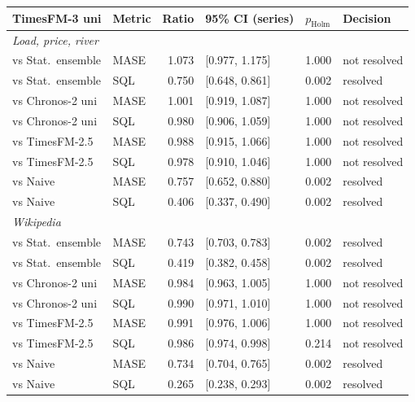 \begin{tabular}{llrlll}
\toprule
TimesFM-3 uni & Metric & Ratio & 95\% CI (series) & $p_{\mathrm{Holm}}$ & Decision \\
\midrule
\multicolumn{6}{l}{\textit{Load, price, river}} \\
vs Stat.\ ensemble & MASE & 1.073 & [0.977, 1.175] & 1.000 & not resolved \\
vs Stat.\ ensemble & SQL & 0.750 & [0.648, 0.861] & 0.002 & resolved \\
vs Chronos-2 uni & MASE & 1.001 & [0.919, 1.087] & 1.000 & not resolved \\
vs Chronos-2 uni & SQL & 0.980 & [0.906, 1.059] & 1.000 & not resolved \\
vs TimesFM-2.5 & MASE & 0.988 & [0.915, 1.066] & 1.000 & not resolved \\
vs TimesFM-2.5 & SQL & 0.978 & [0.910, 1.046] & 1.000 & not resolved \\
vs Naive & MASE & 0.757 & [0.652, 0.880] & 0.002 & resolved \\
vs Naive & SQL & 0.406 & [0.337, 0.490] & 0.002 & resolved \\
\multicolumn{6}{l}{\textit{Wikipedia}} \\
vs Stat.\ ensemble & MASE & 0.743 & [0.703, 0.783] & 0.002 & resolved \\
vs Stat.\ ensemble & SQL & 0.419 & [0.382, 0.458] & 0.002 & resolved \\
vs Chronos-2 uni & MASE & 0.984 & [0.963, 1.005] & 1.000 & not resolved \\
vs Chronos-2 uni & SQL & 0.990 & [0.971, 1.010] & 1.000 & not resolved \\
vs TimesFM-2.5 & MASE & 0.991 & [0.976, 1.006] & 1.000 & not resolved \\
vs TimesFM-2.5 & SQL & 0.986 & [0.974, 0.998] & 0.214 & not resolved \\
vs Naive & MASE & 0.734 & [0.704, 0.765] & 0.002 & resolved \\
vs Naive & SQL & 0.265 & [0.238, 0.293] & 0.002 & resolved \\
\bottomrule
\end{tabular}
